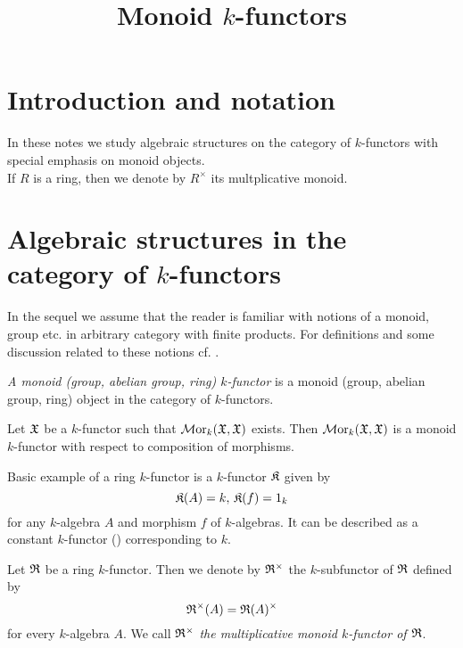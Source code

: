 



\title{Monoid $k$-functors}
\date{}
\maketitle

\section{Introduction and notation}
\noindent
In these notes we study algebraic structures on the category of $k$-functors with special emphasis on monoid objects.\\
If $R$ is a ring, then we denote by $R^{\times}$ its multplicative monoid.

\section{Algebraic structures in the category of $k$-functors}
\noindent
In the sequel we assume that the reader is familiar with notions of a monoid, group etc. in arbitrary category with finite products. For definitions and some discussion related to these notions cf. {\cite[pages 2-5]{Maclane}}.

\begin{definition}
\textit{A monoid (group, abelian group, ring) $k$-functor} is a monoid (group, abelian group, ring) object in the category of $k$-functors.
\end{definition}

\begin{example}\label{example:endomorphisms_of_k_functor}
Let ${\mathfrak X}$ be a $k$-functor such that $\mathcal{M}\mathrm{or}_k({\mathfrak X},{\mathfrak X})$ exists. Then $\mathcal{M}\mathrm{or}_k({\mathfrak X},{\mathfrak X})$ is a monoid $k$-functor with respect to composition of morphisms.
\end{example}

\begin{example}\label{example:constant_ring_k_functor}
Basic example of a ring $k$-functor is a $k$-functor $\mathfrak{K}$ given by
$${\mathfrak K}(A) = k,\,{\mathfrak K}(f) = 1_k$$
for any $k$-algebra $A$ and morphism $f$ of $k$-algebras. It can be described as a constant $k$-functor ({\cite[page 67]{Maclane}}) corresponding to $k$.
\end{example}

\begin{definition}
Let ${\mathfrak R}$ be a ring $k$-functor. Then we denote by ${\mathfrak R}^{\times}$ the $k$-subfunctor of ${\mathfrak R}$ defined by
$${\mathfrak R}^{\times}(A) = {\mathfrak R}(A)^{\times}$$
for every $k$-algebra $A$. We call ${\mathfrak R}^{\times}$ \textit{the multiplicative monoid $k$-functor of ${\mathfrak R}$}.
\end{definition}

